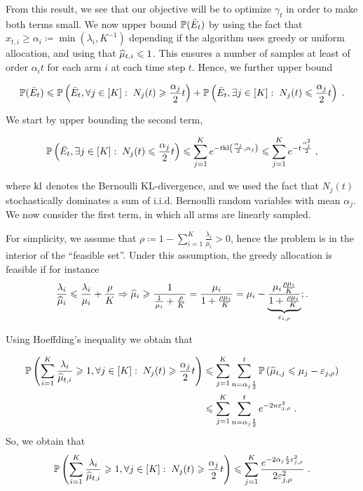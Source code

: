 From this result, we see that our objective will be to optimize $\gamma_t$ in order to make both terms small. We now upper bound $\mathbb{P}(\bar E_t)$ by using the fact that $x_{t,i}\geq \alpha_i \coloneqq \min(\lambda_i, K^{-1})$ depending if the algorithm uses greedy or uniform allocation, and using that $\widehat{\mu}_{t, i}\leqslant 1$. This ensures a number of samples at least of order $\alpha_i t$ for each arm $i$ at each time step $t$. Hence, we further upper bound 

\[\mathbb{P}(\bar E_t) \leqslant \mathbb{P}\left(\bar E_t, \forall j \in [K]:\; N_j(t)\geqslant \frac{\alpha_j}{2}t\right) + \mathbb{P}\left(\bar E_t, \exists j \in [K]:\; N_j(t)\leqslant \frac{\alpha_j}{2}t\right) \;. \]  

We start by upper bounding the second term,

\begin{align*}
\mathbb{P}\left(\bar E_t, \exists j \in [K]:\; N_j(t) \leqslant  \frac{\alpha_j}{2}t\right) \leqslant \sum_{j=1}^K e^{-t \text{\normalfont kl}\left(\frac{\alpha_j}{2}, \alpha_j\right)} \leqslant \sum_{j=1}^K e^{-t \frac{\alpha_j^2}{2}} \;,
\end{align*}

where $\text{\normalfont kl}$ denotes the Bernoulli KL-divergence, and we used the fact that $N_j(t)$ stochastically dominates a sum of i.i.d. Bernoulli random variables with mean $\alpha_j$. We now consider the first term, in which all arms are linearly sampled.

For simplicity, we assume that $\rho \coloneqq 1- \sum_{i=1}^K \frac{\lambda_i}{\mu_i}>0$, hence the problem is in the interior of the ``feasible set''. Under this assumption, the greedy allocation is feasible if for instance 
\[\frac{\lambda_i}{\widehat{\mu}_i}\leqslant \frac{\lambda_i}{\mu_i}+ \frac{\rho}{K} \Rightarrow \widehat{\mu}_i \geqslant \frac{1}{\frac{1}{\mu_i}+\frac{\rho}{K}}=\frac{\mu_i}{1+\frac{\rho \mu_i}{K}} = \mu_{i} - \underbrace{\frac{\mu_i \frac{\rho \mu_i}{K}}{1+\frac{\rho \mu_i}{K}}}_{\varepsilon_{i, \rho }} ;.\]

Using Hoeffding's inequality we obtain that 

\begin{align*}
\mathbb{P}\left(\sum_{i=1}^K \frac{\lambda_i}{\widehat{\mu}_{t, i}}\geqslant 1, \forall j \in [K]:\; N_j(t)\geqslant \frac{\alpha_j}{2}t\right) & \leqslant \sum_{j=1}^K \sum_{n=\alpha_j \frac{t}{2}}^t \mathbb{P}\left(\widehat{\mu}_{t,j} \leqslant \mu_j - \varepsilon_{j, \rho}\right) \\
& \leqslant \sum_{j=1}^K \sum_{n=\alpha_j \frac{t}{2}}^t e^{-2n \varepsilon_{j, \rho}^2} \;. \\
\end{align*}
So, we obtain that
\begin{equation}\label{eq::feasability_greedy}
\mathbb{P}\left(\sum_{i=1}^K \frac{\lambda_i}{\widehat{\mu}_{t, i}}\geqslant 1, \forall j \in [K]:\; N_j(t)\geqslant \frac{\alpha_j}{2}t\right) \leqslant \sum_{j=1}^K \frac{e^{-2\alpha_j \frac{t}{2} \varepsilon_{j, \rho}^2}}{2\varepsilon_{j, \rho}^2} \;.
\end{equation}

